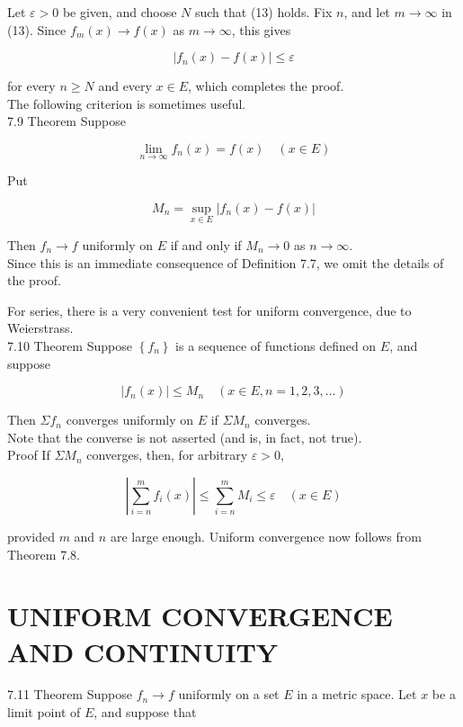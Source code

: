 \documentclass[10pt]{article}
\begin{document}
Let $\varepsilon>0$ be given, and choose $N$ such that (13) holds. Fix $n$, and let $m \rightarrow \infty$ in (13). Since $f_{m}(x) \rightarrow f(x)$ as $m \rightarrow \infty$, this gives


\begin{equation*}
\left|f_{n}(x)-f(x)\right| \leq \varepsilon \tag{14}
\end{equation*}


for every $n \geq N$ and every $x \in E$, which completes the proof.\\
The following criterion is sometimes useful.\\
7.9 Theorem Suppose

$$
\lim _{n \rightarrow \infty} f_{n}(x)=f(x) \quad(x \in E)
$$

Put

$$
M_{n}=\sup _{x \in E}\left|f_{n}(x)-f(x)\right|
$$

Then $f_{n} \rightarrow f$ uniformly on $E$ if and only if $M_{n} \rightarrow 0$ as $n \rightarrow \infty$.\\
Since this is an immediate consequence of Definition 7.7, we omit the details of the proof.

For series, there is a very convenient test for uniform convergence, due to Weierstrass.\\
7.10 Theorem Suppose $\left\{f_{n}\right\}$ is a sequence of functions defined on $E$, and suppose

$$
\left|f_{n}(x)\right| \leq M_{n} \quad(x \in E, n=1,2,3, \ldots)
$$

Then $\Sigma f_{n}$ converges uniformly on $E$ if $\Sigma M_{n}$ converges.\\
Note that the converse is not asserted (and is, in fact, not true).\\
Proof If $\Sigma M_{n}$ converges, then, for arbitrary $\varepsilon>0$,

$$
\left|\sum_{i=n}^{m} f_{i}(x)\right| \leq \sum_{i=n}^{m} M_{i} \leq \varepsilon \quad(x \in E)
$$

provided $m$ and $n$ are large enough. Uniform convergence now follows from Theorem 7.8.

\section*{UNIFORM CONVERGENCE AND CONTINUITY}
7.11 Theorem Suppose $f_{n} \rightarrow f$ uniformly on a set $E$ in a metric space. Let $x$ be a limit point of $E$, and suppose that
\end{document}
